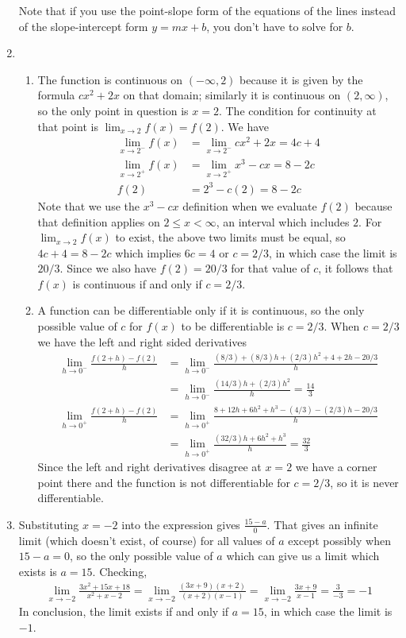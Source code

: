 \documentclass{article}
\newcommand{\ds}{\displaystyle}
\begin{document}
\begin{enumerate}
  Note that if you use the point-slope form of the equations of the lines
  instead of the slope-intercept form $y=mx+b$, you don't have to solve
  for $b$.
\item 
  \begin{enumerate}
  \item The function is continuous on $(-\infty,2)$ because it is given by
    the formula $cx^2+2x$ on that domain; similarly it is continuous on 
    $(2,\infty)$, so the only point in question is $x=2$.  The condition for
    continuity at that point is $\ds \lim_{x\to 2} f(x) = f(2)$.  We have
    \begin{align*}
      \lim_{x\to 2^-} f(x) &= \lim_{x\to 2^-} cx^2 + 2x = 4c+4 \\
      \lim_{x\to 2^+} f(x) &= \lim_{x\to 2^+} x^3 - cx = 8-2c \\
      f(2) &= 2^3-c(2) = 8-2c
    \end{align*}
    Note that we use the $x^3-cx$ definition when we evaluate $f(2)$ 
    because that definition applies on $2\le x < \infty$, an interval which
    includes $2$.
    For $\lim_{x\to 2} f(x)$ to exist, the above two limits must be equal, so
    $4c+4=8-2c$ which implies $6c=4$ or $c=2/3$, in which case the limit
    is $20/3$.  Since we also have $f(2)=20/3$ for that value of $c$, it follows
    that $f(x)$ is continuous if and only if $c=2/3$.
  \item A function can be differentiable only if it is continuous, so the
    only possible value of $c$ for $f(x)$ to be differentiable is $c=2/3$.
    When $c=2/3$ we have the left and right sided derivatives
    \begin{align*}
      \lim_{h\to 0^-} \frac{f(2+h)-f(2)}{h}
      &= \lim_{h\to 0^-} \frac{(8/3)+(8/3)h+(2/3)h^2+4+2h-20/3}{h}
      \\
      &= \lim_{h\to 0^-} \frac{(14/3)h + (2/3)h^2}{h} = \frac{14}{3}
      \\
      \lim_{h\to 0^+} \frac{f(2+h)-f(2)}{h}
      &= \lim_{h\to 0^+} \frac{8+12h+6h^2+h^3-(4/3)-(2/3)h-20/3}{h}
      \\
      &= \lim_{h\to 0^+} \frac{(32/3)h + 6h^2+h^3}{h} = \frac{32}{3}
    \end{align*}
    Since the left and right derivatives disagree at $x=2$ we have a corner
    point there and the function is not differentiable for $c=2/3$, so it
    is never differentiable.
  \end{enumerate}
\item Substituting $x=-2$ into the expression gives $\ds \frac{15-a}{0}$.
  That gives an infinite limit (which doesn't exist, of course) for all values
  of $a$ except possibly when $15-a=0$, 
  so the only possible value of $a$ which can give us a limit which exists
  is $a=15$.  Checking,
  \begin{align*}
    \lim_{x\to -2} \frac{3x^2+15x+18}{x^2+x-2}
    = \lim_{x\to -2} \frac{(3x+9)(x+2)}{(x+2)(x-1)}
    = \lim_{x\to -2} \frac{3x+9}{x-1}
    = \frac{3}{-3} = -1
  \end{align*}
  In conclusion, the limit exists if and only if $a=15$, in which case the
  limit is $-1$.
\end{enumerate}
\end{document}
